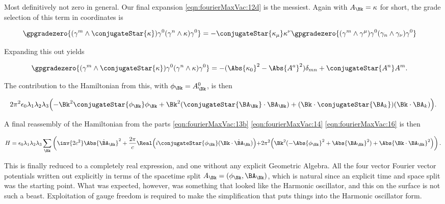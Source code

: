 Most definitively not zero in general.  Our final expansion \ref{eqn:fourierMaxVac:12d} is the messiest.  Again with $A_\Bk = \kappa$ for short, the grade selection of this term in coordinates is

\begin{align}\label{eqn:fourierMaxVac:15}
\gpgradezero{ (\gamma^m \wedge \conjugateStar{\kappa} ) \gamma^0 (\gamma^n \wedge \kappa ) \gamma^0 }
&=
- \conjugateStar{\kappa_\mu} \kappa^\nu
   \gpgradezero{ (\gamma^m \wedge \gamma^\mu) \gamma^0 (\gamma_n \wedge \gamma_\nu) \gamma^0 }
\end{align}

Expanding this out yields

\begin{align}\label{eqn:fourierMaxVac:15b}
\gpgradezero{ (\gamma^m \wedge \conjugateStar{\kappa} ) \gamma^0 (\gamma^n \wedge \kappa ) \gamma^0 }
&=
- ( \Abs{\kappa_0}^2 - \Abs{A^a}^2 ) \delta_{m n} + \conjugateStar{A^n} A^m.
\end{align}

The contribution to the Hamiltonian from this, with $\phi_\Bk = A^0_\Bk$, is then

\begin{align}\label{eqn:fourierMaxVac:16}
2 \pi^2 \epsilon_0 \lambda_1 \lambda_2 \lambda_3 
\Bigl(
-\Bk^2 \conjugateStar{\phi_\Bk} \phi_\Bk 
+ \Bk^2 (\conjugateStar{\BA_\Bk} \cdot \BA_\Bk)
+ (\Bk \cdot \conjugateStar{\BA_k}) (\Bk \cdot \BA_k)
\Bigr).
\end{align}

A final reassembly of the Hamiltonian from the parts \ref{eqn:fourierMaxVac:13b} \ref{eqn:fourierMaxVac:14} \ref{eqn:fourierMaxVac:16} is then

\begin{align}\label{eqn:fourierMaxVac:17}
H = 
\epsilon_0 \lambda_1 \lambda_2 \lambda_3 \sum_\Bk
\left(
\inv{2 c^2} \Abs{\dot{\BA}_\Bk}^2
+\frac{2 \pi}{c} \Real \Bigl( i \conjugateStar{ \phi_\Bk } (\Bk \cdot \dot{\BA}_\Bk) \Bigl)
+2 \pi^2 
\Bigl(
\Bk^2 ( -\Abs{\phi_\Bk}^2 + \Abs{\BA_\Bk}^2 ) + \Abs{\Bk \cdot \BA_\Bk}^2
\Bigr)
\right).
\end{align}

This is finally reduced to a completely real expression, and one without any explicit Geometric Algebra.  All the four vector Fourier vector potentials written out explicitly in terms of the spacetime split $A_\Bk = (\phi_\Bk, \BA_\Bk)$, which is natural since an explicit time and space split was the starting point.  What was expected, however, was something that looked like the Harmonic oscillator, and this on the surface is not such a beast.  Exploitation of gauge freedom is required to make the simplification that puts things into the Harmonic oscillator form.

\EndArticle
